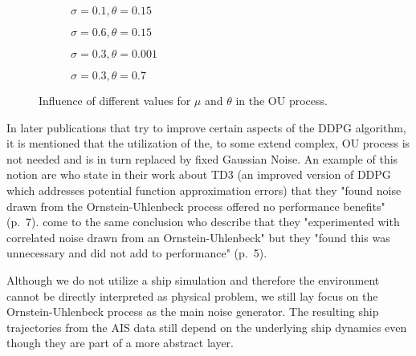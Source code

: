 \begin{figure}[H]
    \begin{subfigure}{0.495\textwidth}
      \centering
        
      \caption{$\sigma = 0.1, \theta = 0.15$}
      \label{fig:lowSigmaNoise}
    \end{subfigure}
    \begin{subfigure}{0.495\textwidth}
      \centering
        
      \caption{$\sigma = 0.6, \theta = 0.15$}
      \label{fig:highSigmaNoise}
    \end{subfigure}
\medskip %
    \begin{subfigure}{0.495\textwidth}
      \centering
        
      \caption{$\sigma = 0.3, \theta = 0.001$}
    \end{subfigure}
    \begin{subfigure}{0.495\textwidth}
      \centering
        
      \caption{$\sigma = 0.3, \theta = 0.7$}
    \end{subfigure}
\caption{Influence of different values for $\mu$ and $\theta$ in the OU process.}
\label{fig:ouProcess}
\end{figure}

\par
In later publications that try to improve certain aspects of the DDPG algorithm, it is mentioned that the utilization of the, to some extend complex, OU process is not needed and is in turn replaced by fixed Gaussian Noise. An example of this notion are \cite{fujimoto2018addressing} who state in their work about TD3 (an improved version of DDPG which addresses potential function approximation errors) that they "found noise drawn from the Ornstein-Uhlenbeck process offered no performance benefits" (p.~7). \cite{barth2018distributed} come to the same conclusion who describe that they "experimented with correlated noise drawn from an Ornstein-Uhlenbeck" but they "found this was unnecessary and did
not add to performance" (p.~5).
\par
Although we do not utilize a ship simulation and therefore the environment cannot be directly interpreted as physical problem, we still lay focus on the Ornstein-Uhlenbeck process as the main noise generator. The resulting ship trajectories from the AIS data still depend on the underlying ship dynamics even though they are part of a more abstract layer.